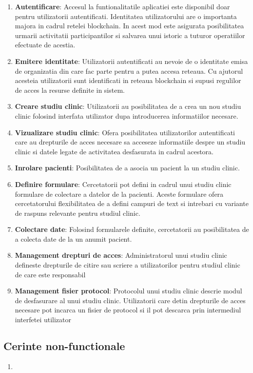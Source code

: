 \documentclass[12pt,a4paper,twoside]{report}
\begin{document}
\begin{enumerate}
	\item \textbf{Autentificare}: Accesul la funtionalitatile aplicatiei este disponibil doar pentru utilizatorii autentificati. Identitatea utilizatorului are o importanta majora in cadrul retelei blockchain. In acest mod este asigurata posibilitatea urmarii activitatii participantilor si salvarea unui istoric a tuturor operatiilor efectuate de acestia. 
	\item \textbf{Emitere identitate}: Utilizatorii autentificati au nevoie de o identitate emisa de organizatia din care fac parte pentru a putea accesa reteaua. Cu ajutorul acesteia utilizatorii sunt identificati in reteaua blockchain si supusi regulilor de acces la resurse definite in sistem.
	\item \textbf{Creare studiu clinic}: Utilizatorii au posibilitatea de a crea un nou studiu clinic folosind interfata utilizator dupa introducerea informatiilor necesare.
	\item \textbf{Vizualizare studiu clinic}: Ofera posibilitatea utilizatorilor autentificati care au drepturile de acces necesare sa acceseze informatiile despre un studiu clinic si datele legate de activitatea desfasurata in cadrul acestora.
	\item \textbf{Inrolare pacienti}: Posibilitatea de a asocia un pacient la un studiu clinic.
	\item \textbf{Definire formulare}: Cercetatorii pot defini in cadrul unui studiu clinic formulare de colectare a datelor de la pacienti. Aceste formulare ofera cercetatorului flexibilitatea de a defini campuri de text si intrebari cu variante de raspuns relevante pentru studiul clinic.
	\item \textbf{Colectare date}: Folosind formularele definite, cercetatorii au posibilitatea de a colecta date de la un anumit pacient.
	\item \textbf{Management drepturi de acces}: Administratorul unui studiu clinic defineste drepturile de citire sau scriere a utilizatorilor pentru studiul clinic de care este responsabil
	\item \textbf{Management fisier protocol}: Protocolul unui studiu clinic descrie modul de desfasurare al unui studiu clinic. Utilizatorii care detin drepturile de acces necesare pot incarca un fisier de protocol si il pot descarca prin intermediul interfetei utilizator
\end{enumerate}

\subsection{Cerinte non-functionale}
\begin{enumerate}
\item \textbf{}
\end{enumerate}
\end{document}
